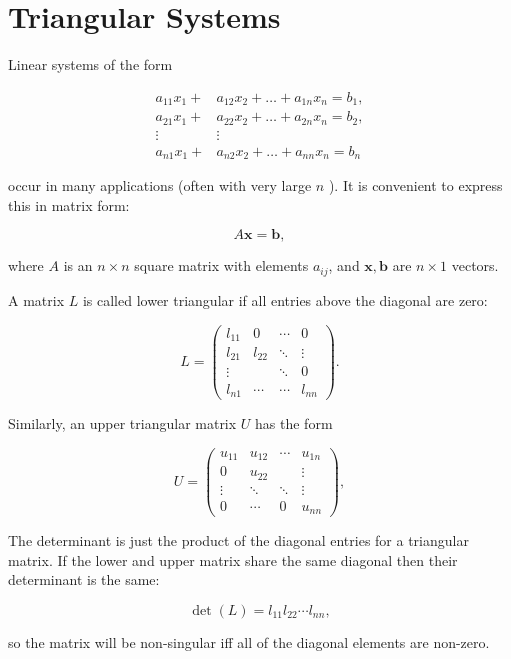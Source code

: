 \section{Triangular Systems}

\begin{definition}
  Linear systems of the form

\[
\begin{aligned}
a_{11} x_1+ & a_{12} x_2+\ldots+a_{1 n} x_n=b_1, \\
a_{21} x_1+ & a_{22} x_2+\ldots+a_{2 n} x_n=b_2, \\
\vdots & \vdots \\
a_{n 1} x_1+ & a_{n 2} x_2+\ldots+a_{n n} x_n=b_n
\end{aligned}
\]

occur in many applications (often with very large \(n\) ). It is convenient to express this in matrix form:

\[
A \mathbf{x}=\mathbf{b},
\]

where \(A\) is an \(n \times n\) square matrix with elements \(a_{i j}\), and \(\mathbf{x}, \mathbf{b}\) are \(n \times 1\) vectors.
\end{definition}

\begin{definition}
  A matrix \(L\) is called lower triangular if all entries above the diagonal are zero:

\[
L=\left(\begin{array}{cccc}
l_{11} & 0 & \cdots & 0 \\
l_{21} & l_{22} & \ddots & \vdots \\
\vdots & & \ddots & 0 \\
l_{n 1} & \cdots & \cdots & l_{n n}
\end{array}\right) .
\]

Similarly, an upper triangular matrix \(U\) has the form

\[
U=\left(\begin{array}{cccc}
u_{11} & u_{12} & \cdots & u_{1 n} \\
0 & u_{22} & & \vdots \\
\vdots & \ddots & \ddots & \vdots \\
0 & \cdots & 0 & u_{n n}
\end{array}\right),
\]

The determinant is just the product of the diagonal entries for a triangular matrix. If the lower and upper matrix share the same diagonal then their determinant is the same:

\[
\operatorname{det}(L)=l_{11} l_{22} \cdots l_{n n},
\]

so the matrix will be non-singular iff all of the diagonal elements are non-zero.
\end{definition}

